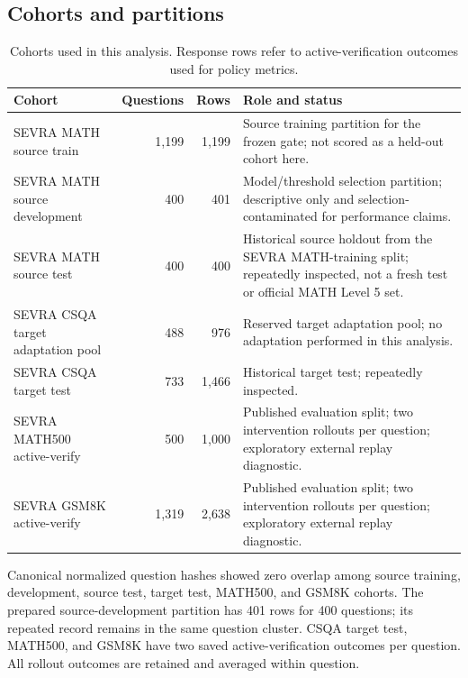 \documentclass[conference]{IEEEtran}
\begin{document}
\subsection{Cohorts and partitions}
\begin{table}[t]
\caption{Cohorts used in this analysis. Response rows refer to active-verification outcomes used for policy metrics.}
\label{tab:cohorts}
\centering\small
\begin{tabularx}{\textwidth}{l r r X}
\toprule
\textbf{Cohort} & \textbf{Questions} & \textbf{Rows} & \textbf{Role and status}\\
\midrule
SEVRA MATH source train & 1,199 & 1,199 & Source training partition for the frozen gate; not scored as a held-out cohort here.\\
SEVRA MATH source development & 400 & 401 & Model/threshold selection partition; descriptive only and selection-contaminated for performance claims.\\
SEVRA MATH source test & 400 & 400 & Historical source holdout from the SEVRA MATH-training split; repeatedly inspected, not a fresh test or official MATH Level 5 set.\\
SEVRA CSQA target adaptation pool & 488 & 976 & Reserved target adaptation pool; no adaptation performed in this analysis.\\
SEVRA CSQA target test & 733 & 1,466 & Historical target test; repeatedly inspected.\\
SEVRA MATH500 active-verify & 500 & 1,000 & Published evaluation split; two intervention rollouts per question; exploratory external replay diagnostic.\\
SEVRA GSM8K active-verify & 1,319 & 2,638 & Published evaluation split; two intervention rollouts per question; exploratory external replay diagnostic.\\
\bottomrule
\end{tabularx}
\end{table}

Canonical normalized question hashes showed zero overlap among source training, development, source test, target test, MATH500, and GSM8K cohorts. The prepared source-development partition has 401 rows for 400 questions; its repeated record remains in the same question cluster. CSQA target test, MATH500, and GSM8K have two saved active-verification outcomes per question. All rollout outcomes are retained and averaged within question.
\end{document}
